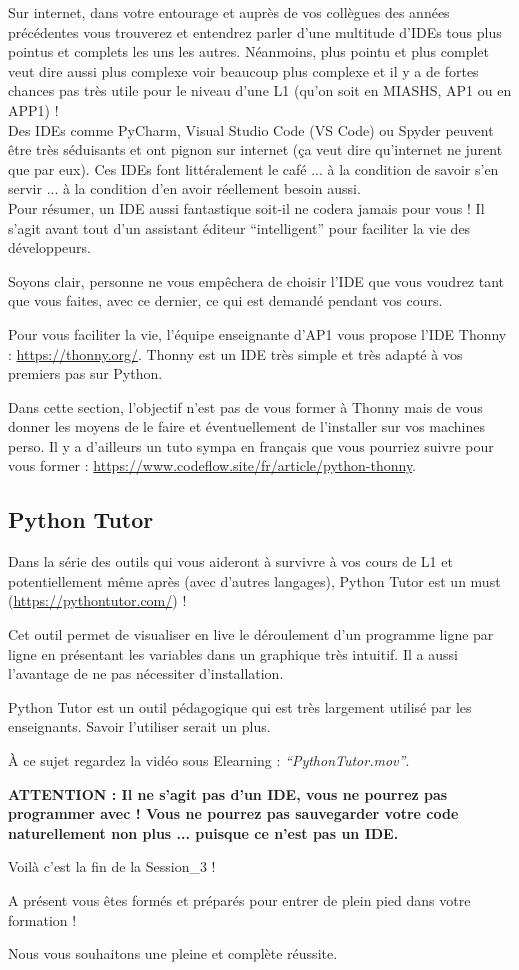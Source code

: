 \documentclass{article}
\begin{document}
Sur internet, dans votre entourage et auprès de vos collègues des années précédentes vous trouverez et entendrez parler d'une multitude d'IDEs tous plus pointus et complets les uns les autres. Néanmoins, plus pointu et plus complet veut dire aussi plus complexe voir beaucoup plus complexe et il y a de fortes chances pas très utile pour le niveau d'une L1 (qu'on soit en MIASHS, AP1 ou en APP1) ! \\
Des IDEs comme PyCharm, Visual Studio Code (VS Code) ou Spyder peuvent être très séduisants et ont pignon sur internet (\c ca veut dire qu'internet ne jurent que par eux). Ces IDEs font littéralement le café ... à la condition de savoir s'en servir ... à la condition d'en avoir réellement besoin aussi. \\
Pour résumer, un IDE aussi fantastique soit-il ne codera jamais pour vous ! Il s'agit avant tout d'un assistant éditeur ``intelligent'' pour faciliter la vie des développeurs. 

Soyons clair, personne ne vous empêchera de choisir l'IDE que vous voudrez tant que vous faites, avec ce dernier, ce qui est demandé pendant vos cours.

Pour vous faciliter la vie, l'équipe enseignante d'AP1 vous propose l'IDE Thonny : \url{https://thonny.org/}. Thonny est un IDE très simple et très adapté à vos premiers pas sur Python. 

Dans cette section, l'objectif n'est pas de vous former à Thonny mais de vous donner les moyens de le faire et éventuellement de l'installer sur vos machines perso. Il y a d'ailleurs un tuto sympa en fran\c cais que vous pourriez suivre pour vous former : \url{https://www.codeflow.site/fr/article/python-thonny}.

\subsection{Python Tutor}

Dans la série des outils qui vous aideront à survivre à vos cours de L1 et potentiellement même après (avec d'autres langages), 
Python Tutor est un must (\url{https://pythontutor.com/}) ! 

Cet outil permet de visualiser en live le déroulement d'un programme ligne par ligne en présentant les variables dans un graphique très intuitif. Il a aussi l'avantage de ne pas nécessiter d'installation. 

Python Tutor est un outil pédagogique qui est très largement utilisé par les enseignants. Savoir l'utiliser serait un plus. 

À ce sujet regardez la vidéo sous Elearning : \emph{``PythonTutor.mov''}.

\textbf{ATTENTION : Il ne s'agit pas d'un IDE, vous ne pourrez pas programmer avec ! Vous ne pourrez pas sauvegarder votre code naturellement non plus ... puisque ce n'est pas un IDE.}


Voilà c'est la fin de la Session\_3 ! 

A présent vous êtes formés et préparés pour entrer de plein pied dans votre formation ! 

Nous vous souhaitons une pleine et complète réussite.
\end{document}
